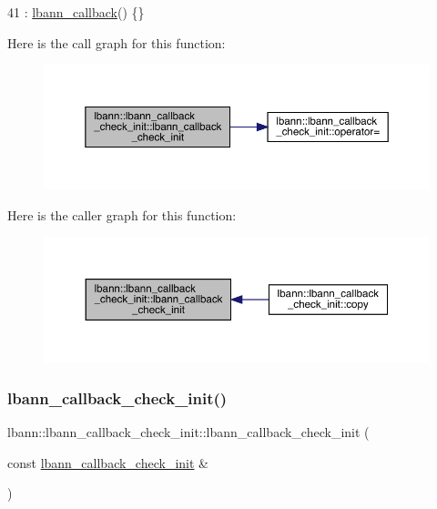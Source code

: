 \begin{DoxyCode}
41 : \hyperlink{classlbann_1_1lbann__callback_a679057298a41ddd47f08c157f756c584}{lbann\_callback}() \{\}
\end{DoxyCode}
Here is the call graph for this function\+:\nopagebreak
\begin{figure}[H]
\begin{center}
\leavevmode
\includegraphics[width=350pt]{classlbann_1_1lbann__callback__check__init_a3910da2c4e972567d79e5e414404a3da_cgraph}
\end{center}
\end{figure}
Here is the caller graph for this function\+:\nopagebreak
\begin{figure}[H]
\begin{center}
\leavevmode
\includegraphics[width=350pt]{classlbann_1_1lbann__callback__check__init_a3910da2c4e972567d79e5e414404a3da_icgraph}
\end{center}
\end{figure}
\mbox{\label{classlbann_1_1lbann__callback__check__init_a1378d95f56106f6983378aed464c5747}} 
\subsubsection{\texorpdfstring{lbann\+\_\+callback\+\_\+check\+\_\+init()}{lbann\_callback\_check\_init()}\hspace{0.1cm}{\footnotesize\ttfamily [2/2]}}
{\footnotesize\ttfamily lbann\+::lbann\+\_\+callback\+\_\+check\+\_\+init\+::lbann\+\_\+callback\+\_\+check\+\_\+init (\begin{DoxyParamCaption}\item[{const \hyperlink{classlbann_1_1lbann__callback__check__init}{lbann\+\_\+callback\+\_\+check\+\_\+init} \&}]{ }\end{DoxyParamCaption})\hspace{0.3cm}{\ttfamily [default]}}



